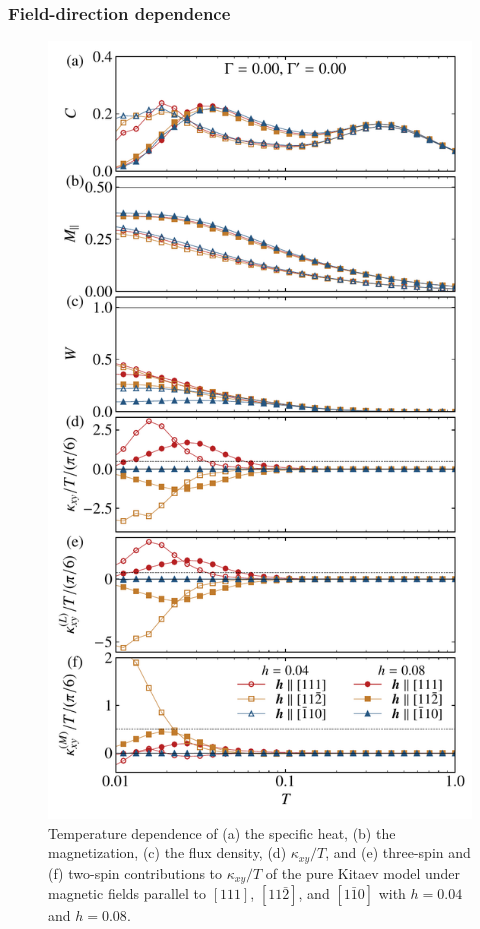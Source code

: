 \documentclass[twocolumn,superscriptaddress,showpacs, longbibliography, aps, prx]{revtex4-2}
\begin{document}
\subsubsection{Field-direction dependence}
\label{subsec:field_direction_dep}

\begin{figure}[tbh]
  \begin{center}
    \includegraphics[width=\linewidth]{Data_for_figs/plot/fig-08-XTRG-adep.pdf}
  \end{center}  
  \caption{Temperature dependence of (a) the specific heat, (b) the magnetization, (c) the flux density, (d) $\kappa_{xy}/T$, and (e) three-spin and (f) two-spin contributions to $\kappa_{xy}/T$ of the pure Kitaev model under magnetic fields parallel to $[111]$, $[11\bar{2}]$, and $[1\bar{1}0]$ with $h=0.04$ and $h = 0.08$.
  }
  \label{fig:CMF_ab}
\end{figure}
\end{document}
